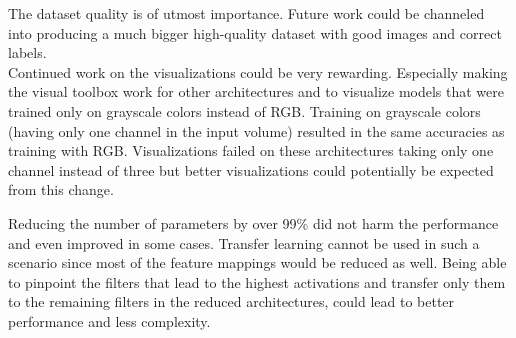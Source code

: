 The dataset quality is of utmost importance. Future work could be channeled into producing a much bigger high-quality dataset with good images and correct labels.\\

Continued work on the visualizations could be very rewarding. Especially making the visual toolbox work for other architectures and to visualize models that were trained only on grayscale colors instead of RGB. Training on grayscale colors (having only one channel in the input volume) resulted in the same accuracies as training with RGB. Visualizations failed on these architectures taking only one channel instead of three but better visualizations could potentially be expected from this change.

Reducing the number of parameters by over 99\% did not harm the performance and even improved in some cases. Transfer learning cannot be used in such a scenario since most of the feature mappings would be reduced as well. Being able to pinpoint the filters that lead to the highest activations and transfer only them to the remaining filters in the reduced architectures, could lead to better performance and less complexity.\\

